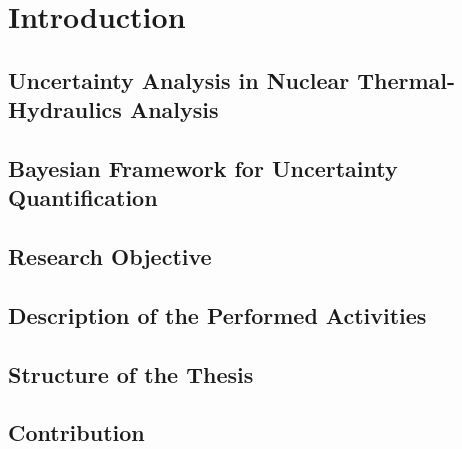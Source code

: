 \chapter{Introduction}

\section{Uncertainty Analysis in Nuclear Thermal-Hydraulics Analysis}

\section{Bayesian Framework for Uncertainty Quantification}

\section{Research Objective}

\section{Description of the Performed Activities}

\section{Structure of the Thesis}

\section{Contribution}
\lipsum[1]
